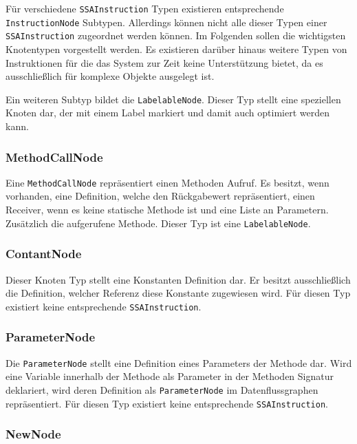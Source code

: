 Für verschiedene \texttt{SSAInstruction} Typen existieren entsprechende 
\texttt{InstructionNode} Subtypen. Allerdings können nicht alle dieser Typen 
einer \texttt{SSAInstruction} zugeordnet werden können. Im Folgenden sollen die
wichtigsten Knotentypen vorgestellt werden. Es existieren darüber hinaus weitere
Typen von Instruktionen für die das System zur Zeit keine Unterstützung bietet, 
da es ausschließlich für komplexe Objekte ausgelegt ist.

Ein weiteren Subtyp bildet die \texttt{LabelableNode}. Dieser Typ stellt eine
speziellen Knoten dar, der mit einem Label markiert und damit auch
optimiert werden kann. 

\subsubsection{MethodCallNode}

Eine \texttt{MethodCallNode} repräsentiert einen Methoden Aufruf. Es besitzt, wenn
vorhanden, eine Definition, welche den Rückgabewert repräsentiert, einen Receiver, 
wenn es keine statische Methode ist und eine Liste an Parametern. Zusätzlich die 
aufgerufene Methode. Dieser Typ ist eine \texttt{LabelableNode}.

\subsubsection{ContantNode}

Dieser Knoten Typ stellt eine Konstanten Definition dar. Er besitzt ausschließlich 
die Definition, welcher Referenz diese Konstante zugewiesen wird. Für diesen Typ
existiert keine entsprechende \texttt{SSAInstruction}.

\subsubsection{ParameterNode}

Die \texttt{ParameterNode} stellt eine Definition eines Parameters der Methode dar.
Wird eine Variable innerhalb der Methode als Parameter in der Methoden Signatur
deklariert, wird deren Definition als \texttt{ParameterNode} im Datenflussgraphen
repräsentiert. Für diesen Typ existiert keine entsprechende \texttt{SSAInstruction}.

\subsubsection{NewNode}

